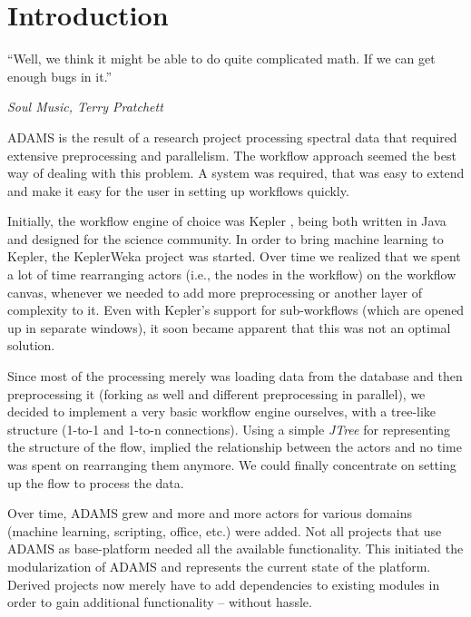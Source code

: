 

\chapter{Introduction}

\epigraph{``Well, we think it might be able to do quite complicated math. If we can get enough bugs in it.''}{\textit{Soul Music, Terry Pratchett}}

ADAMS is the result of a research project processing spectral data that
required extensive preprocessing and parallelism. The workflow approach seemed
the best way of dealing with this problem. A system was required, that was easy
to extend and make it easy for the user in setting up workflows quickly.

Initially, the workflow engine of choice was Kepler \cite{kepler}, being both
written in Java and designed for the science community. In order to bring
machine learning to Kepler, the KeplerWeka project \cite{keplerweka} was
started. Over time we realized that we spent a lot of time rearranging actors
(i.e., the nodes in the workflow) on the workflow canvas, whenever we needed to
add more preprocessing or another layer of complexity to it. Even with Kepler's
support for sub-workflows (which are opened up in separate windows), it soon
became apparent that this was not an optimal solution.

Since most of the processing merely was loading data from the database and
then preprocessing it (forking as well and different preprocessing in
parallel), we decided to implement a very basic workflow engine ourselves, with
a tree-like structure (1-to-1 and 1-to-n connections). Using a simple
\textit{JTree} for representing the structure of the flow, implied the
relationship between the actors and no time was spent on rearranging them
anymore. We could finally concentrate on setting up the flow to process the
data.

Over time, ADAMS grew and more and more actors for various domains (machine
learning, scripting, office, etc.) were added. Not all projects that use ADAMS
as base-platform needed all the available functionality. This initiated the
modularization of ADAMS and represents the current state of the platform.
Derived projects now merely have to add dependencies to existing modules in
order to gain additional functionality -- without hassle. \\

